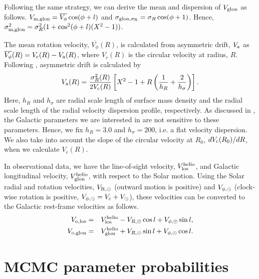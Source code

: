 \documentclass[11pt,a4paper]{article}
\begin{document}
Following the same strategy, we can derive the mean and dispersion of $V_{\rm glon}$ as follows. $V_{\rm m, glon}=\overline{V_{\phi}}\cos(\phi+l)$ and $\sigma_{\rm glon,\sigma_R}=\sigma_R \cos(\phi+1)$. Hence, $\sigma_{\rm m, glon}^2=\sigma_R^2(1+\cos^2(\phi+l) (X^2-1))$.

The mean rotation velocity, $\overline{V_{\phi}} (R)$, is calculated from asymmetric drift, $V_{\rm a}$ as $\overline{V_{\phi}}(R)=V_{\rm c} (R)-V_{\rm a}(R)$, where $V_c(R)$ is the circular velocity at radius, $R$. Following \citet{baabbdc12}, asymmetric drift is calculated by 
\begin{equation}
V_{\rm a}(R)=\frac{\sigma_R^2(R)}{2 V_{\rm c}(R)} \left[X^2-1+R\left(\frac{1}{h_R}+\frac{2}{h_{\sigma}}\right)\right].
\end{equation}
Here, $h_R$ and $h_{\sigma}$ are radial scale length of surface mass density and the radial scale length of the radial velocity dispersion profile, respectively. As discussed in \citet{baabbdc12}, the Galactic parameters we are interested in are not sensitive to these parameters. Hence, we fix $h_R=3.0$ and $h_{\sigma}=200$, i.e. a flat velocity dispersion. We also take into account the slope of the circular velocity at $R_0$, $d V_{\rm c}(R_0)/dR$, when we calculate $V_c(R)$. 

In observational data, we have the line-of-sight velocity, $V_{\rm los}^{\rm helio}$, and Galactic longitudinal velocity, $V_{\rm glon}^{\rm helio}$, with respect to the Solar motion. Using the Solar radial and rotation velocities, $V_{\rm R,\odot}$ (outward motion is positive) and $V_{\rm \phi,\odot}$ (clock-wise rotation is positive, $V_{\rm \phi,\odot}=V_{\rm c}+V_{\odot}$), these velocities can be converted to the Galactic rest-frame velocities as follows.
\begin{eqnarray}
V_{\rm o,los} & = & V_{\rm los}^{\rm helio} - V_{R,\odot} \cos l + V_{\rm \phi,\odot} \sin l, \\
V_{\rm o,glon} & = & V_{\rm glon}^{\rm helio} + V_{R,\odot} \sin l + V_{\rm \phi,\odot} \cos l.
\end{eqnarray}

\section{MCMC parameter probabilities}
\end{document}
